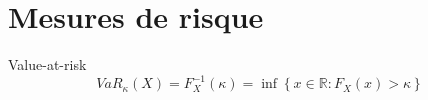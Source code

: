 \chapter{Mesures de risque}

\begin{definition}{Value-at-risk}{}
	$$VaR_\kappa (X) = F^{-1}_X(\kappa) = \inf \left\{x\in \mathbb{R} : F_X(x) > \kappa \right\}$$
\end{definition}






